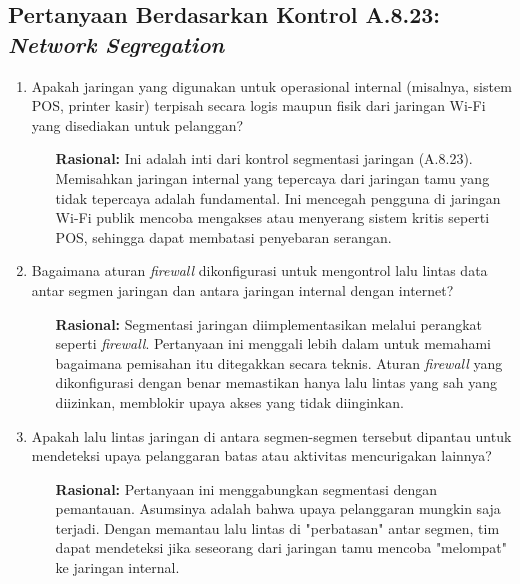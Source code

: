 \documentclass[12pt, a4paper]{report}
\begin{document}
\subsection{Pertanyaan Berdasarkan Kontrol A.8.23: \textit{Network Segregation}}
\begin{enumerate}
    \item Apakah jaringan yang digunakan untuk operasional internal (misalnya, sistem POS, printer kasir) terpisah secara logis maupun fisik dari jaringan Wi-Fi yang disediakan untuk pelanggan?
    \begin{itemize}
        \item[\textbf{Rasional:}] Ini adalah inti dari kontrol segmentasi jaringan (A.8.23). Memisahkan jaringan internal yang tepercaya dari jaringan tamu yang tidak tepercaya adalah fundamental. Ini mencegah pengguna di jaringan Wi-Fi publik mencoba mengakses atau menyerang sistem kritis seperti POS, sehingga dapat membatasi penyebaran serangan.
    \end{itemize}

    \item Bagaimana aturan \textit{firewall} dikonfigurasi untuk mengontrol lalu lintas data antar segmen jaringan dan antara jaringan internal dengan internet?
    \begin{itemize}
        \item[\textbf{Rasional:}] Segmentasi jaringan diimplementasikan melalui perangkat seperti \textit{firewall}. Pertanyaan ini menggali lebih dalam untuk memahami bagaimana pemisahan itu ditegakkan secara teknis. Aturan \textit{firewall} yang dikonfigurasi dengan benar memastikan hanya lalu lintas yang sah yang diizinkan, memblokir upaya akses yang tidak diinginkan.
    \end{itemize}
    
    \item Apakah lalu lintas jaringan di antara segmen-segmen tersebut dipantau untuk mendeteksi upaya pelanggaran batas atau aktivitas mencurigakan lainnya? \citep{haryanto2021wifi}
    \begin{itemize}
        \item[\textbf{Rasional:}] Pertanyaan ini menggabungkan segmentasi dengan pemantauan. Asumsinya adalah bahwa upaya pelanggaran mungkin saja terjadi. Dengan memantau lalu lintas di "perbatasan" antar segmen, tim dapat mendeteksi jika seseorang dari jaringan tamu mencoba "melompat" ke jaringan internal.
    \end{itemize}
\end{enumerate}
\end{document}
